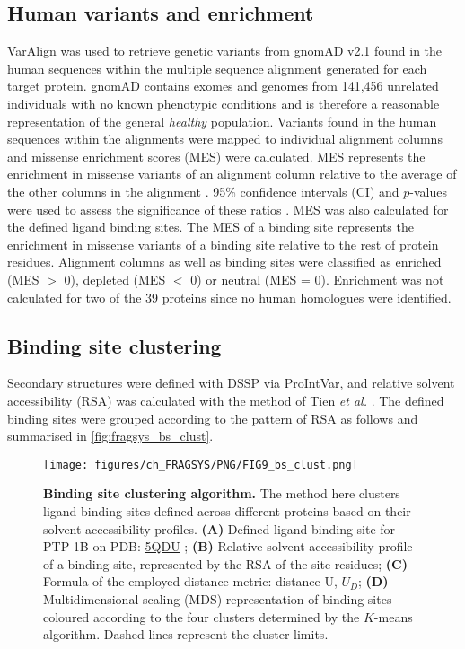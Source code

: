 \subsection{Human variants and enrichment}

VarAlign \cite{MACGOWAN_2020_DRSASP} was used to retrieve genetic variants from gnomAD v2.1 \cite{KARCZEWSKI_2020_GNOMAD} found in the human sequences within the multiple sequence alignment generated for each target protein. gnomAD contains exomes and genomes from 141,456 unrelated individuals with no known phenotypic conditions and is therefore a reasonable representation of the general \textit{healthy} population. Variants found in the human sequences within the alignments were mapped to individual alignment columns and missense enrichment scores (MES) were calculated. MES represents the enrichment in missense variants of an alignment column relative to the average of the other columns in the alignment \cite{MACGOWAN_2017_VARIANTS, MACGOWAN_2024_VARIANTS}. 95\% confidence intervals (CI) and $p$-values were used to assess the significance of these ratios \cite{SZUMILAS_2010_ODDSRATIOS}. MES was also calculated for the defined ligand binding sites. The MES of a binding site represents the enrichment in missense variants of a binding site relative to the rest of protein residues. Alignment columns as well as binding sites were classified as enriched (MES $>$ 0), depleted (MES $<$ 0) or neutral (MES = 0). Enrichment was not calculated for two of the 39 proteins since no human homologues were identified.

\subsection{Binding site clustering}

Secondary structures were defined with DSSP \cite{KABSCH_1983_DSSP} via ProIntVar, and relative solvent accessibility (RSA) was calculated with the method of  Tien \textit{et al.} \cite{TIEN_2013_RSA}. The defined binding sites were grouped according to the pattern of RSA as follows and summarised in \autoref{fig:fragsys_bs_clust}.

\begin{figure}[htb!]
    \centering
    \texttt{[image: figures/ch\_FRAGSYS/PNG/FIG9\_bs\_clust.png]}
    \caption[Binding site clustering algorithm]{\textbf{Binding site clustering algorithm.} The method here clusters ligand binding sites defined across different proteins based on their solvent accessibility profiles. \textbf{(A)} Defined ligand binding site for PTP-1B on PDB: \href{https://www.ebi.ac.uk/pdbe/entry/pdb/5qdu}{5QDU} \cite{KEEDY_2018_PTP1B}; \textbf{(B)} Relative solvent accessibility profile of a binding site, represented by the RSA of the site residues; \textbf{(C)} Formula of the employed distance metric: distance U, $U_{D}$; \textbf{(D)} Multidimensional scaling (MDS) representation of binding sites coloured according to the four clusters determined by the $K$-means algorithm. Dashed lines represent the cluster limits.}
    \label{fig:fragsys_bs_clust}
\end{figure}

